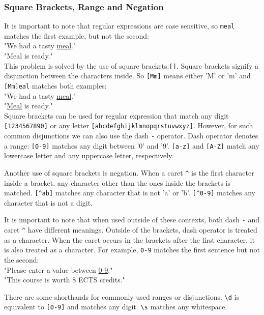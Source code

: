 \subsubsection{Square Brackets, Range and Negation}

It is important to note that regular expressions are case sensitive, so \texttt{meal} matches the first example, but not the second:\\
"We had a tasty \underline{meal}."\\
"Meal is ready."\\
This problem is solved by the use of square brackets:\texttt{[]}.
Square brackets signify a disjunction between the characters inside. 
So \texttt{[Mm]} means either 'M' or 'm' and \texttt{[Mm]eal} matches both examples:\\
"We had a tasty \underline{meal}."\\
"\underline{Meal} is ready."\\
Square brackets can be used for regular expression that match any digit \texttt{[1234567890]} or any letter \texttt{[abcdefghijklmnopqrstuvwxyz]}.
However, for such common disjunctions we can also use the dash \texttt{-} operator.
Dash operator denotes a range: \texttt{[0-9]} matches any digit between '0' and '9'.
\texttt{[a-z]} and \texttt{[A-Z]} match any lowercase letter and any uppercase letter, respectively.

Another use of square brackets is negation. 
When a caret \texttt{\^} is the first character inside a bracket, any character other than the ones inside the brackets is matched.
\texttt{[\^{}ab]} matches any character that is not 'a' or 'b'. 
\texttt{[\^{}0-9]} matches any character that is not a digit.

It is important to note that when used outside of these contexts, both dash \texttt{-} and caret \texttt{\^} have different meanings.
Outside of the brackets, dash operator is treated as a character. 
When the caret occurs in the brackets after the first character, it is also treated as a character.
For example, \texttt{0-9} matches the first sentence but not the second:\\
"Please enter a value between \underline{0-9}."\\
"This course is worth 8 ECTS credits."

There are some shorthands for commonly used ranges or disjunctions.
\texttt{\textbackslash d} is equivalent to \texttt{[0-9]} and matches any digit. 
\texttt{\textbackslash s} matches any whitespace. 

